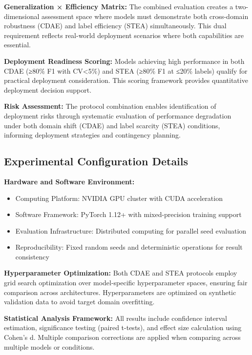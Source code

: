 \textbf{Generalization × Efficiency Matrix:} The combined evaluation creates a two-dimensional assessment space where models must demonstrate both cross-domain robustness (CDAE) and label efficiency (STEA) simultaneously. This dual requirement reflects real-world deployment scenarios where both capabilities are essential.

\textbf{Deployment Readiness Scoring:} Models achieving high performance in both CDAE (≥80\% F1 with CV<5\%) and STEA (≥80\% F1 at ≤20\% labels) qualify for practical deployment consideration. This scoring framework provides quantitative deployment decision support.

\textbf{Risk Assessment:} The protocol combination enables identification of deployment risks through systematic evaluation of performance degradation under both domain shift (CDAE) and label scarcity (STEA) conditions, informing deployment strategies and contingency planning.

\subsection{Experimental Configuration Details}

\textbf{Hardware and Software Environment:}
\begin{itemize}
\item Computing Platform: NVIDIA GPU cluster with CUDA acceleration
\item Software Framework: PyTorch 1.12+ with mixed-precision training support
\item Evaluation Infrastructure: Distributed computing for parallel seed evaluation
\item Reproducibility: Fixed random seeds and deterministic operations for result consistency
\end{itemize}

\textbf{Hyperparameter Optimization:} Both CDAE and STEA protocols employ grid search optimization over model-specific hyperparameter spaces, ensuring fair comparison across architectures. Hyperparameters are optimized on synthetic validation data to avoid target domain overfitting.

\textbf{Statistical Analysis Framework:} All results include confidence interval estimation, significance testing (paired t-tests), and effect size calculation using Cohen's d. Multiple comparison corrections are applied when comparing across multiple models or conditions.